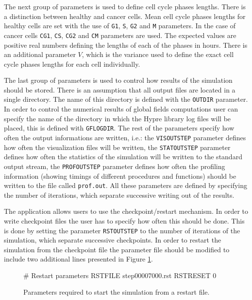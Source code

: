\documentclass[10pt]{article}
\newenvironment{code}%
   {\snugshade\verbatim}%
   {\endverbatim\endsnugshade}
\begin{document}
\indent The next group of parameters is used to define cell cycle phases lengths. There is a distinction between healthy and cancer cells. Mean cell cycle phases lengths for healthy cells are set with the use of {\tt G1}, {\tt S}, {\tt G2} and {\tt M} parameters. In the case of cancer cells {\tt CG1}, {\tt CS}, {\tt CG2} and {\tt CM} parameters are used. The expected values are positive real numbers defining the lengths of each of the phases in hours. There is an additional parameter $V$, which is the variance used to define the exact cell cycle phases lengths for each cell individually. 

\indent The last group of parameters is used to control how results of the simulation should be stored. There is an assumption that all output files are located in a single directory. The name of this directory is defined with the {\tt OUTDIR} parameter. In order to control the numerical results of global fields computations user can specify the name of the directory in which the Hypre library log files will be placed, this is defined with {\tt GFLOGDIR}. The rest of the parameters specify how often the output informations are written, i.e.: the {\tt VISOUTSTEP} parameter defines how often the visualization files will be written, the {\tt STATOUTSTEP} parameter defines how often the statistics of the simulation will be written to the standard output stream, the {\tt PROFOUTSTEP} parameter defines how often the profiling information (showing timings of different procedures and functions) should be written to the file called {\tt prof.out}. All these parameters are defined by specifying the number of iterations, which separate successive writing out of the results.

\indent The application allows users to use the checkpoint/restart mechanism. In order to write checkpoint files the user has to specify how often this should be done. This is done by setting the parameter {\tt RSTOUTSTEP} to the number of iterations of the simulation, which separate successive checkpoints. In order to restart the simulation from the checkpoint file the parameter file should be modified to include two additional lines presented in Figure \ref{parameterrestart}.

\begin{figure}
\begin{code}
# Restart parameters
RSTFILE step00007000.rst
RSTRESET 0
\end{code}
\caption{Parameters required to start the simulation from a restart file.}
\label{parameterrestart}
\end{figure}
\end{document}
